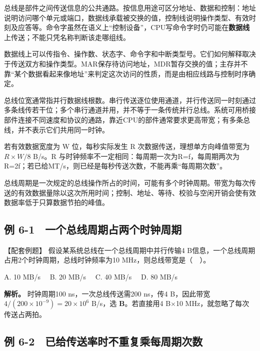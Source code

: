 总线是部件之间传送信息的公共通路。按信息用途可区分地址、数据和控制：地址说明访问哪个单元或端口，数据线承载被交换的值，控制线说明操作类型、有效时刻及应答等。命令字虽然在语义上``控制设备''，CPU写命令字时仍可能在\textbf{数据线}上传送；不能只凭名称判断该走哪组线。

数据线上可以传指令、操作数、状态字、命令字和中断类型号。它们如何解释取决于传送双方和操作类型。MAR保存待访问地址，MDR暂存交换的值；主存并不靠``某个数据看起来像地址''来判定这次访问的性质，而是由相应线路与控制时序确定。

总线位宽通常指并行数据线根数。串行传送逐位使用通道，并行传送同一时刻通过多条线传若干位；多个串行通道并用，并不等于一条传统并行总线。系统可用桥接部件连接不同速度和协议的通路，靠近CPU的部件通常要求更高带宽；有多条总线，并不表示它们共用同一时钟。

{\begin{methodbox}[带宽先写每次字节数与每秒次数]

若有效数据宽度为 W 位，每秒实际发生 R 次数据传送，理想单方向峰值带宽为 \(R\times W/8\) B/s。R 与时钟频率不一定相同：每周期一次为R=f，每周期两次为R=2f；若已给MT/s，则已经是每秒传送次数，不能再乘``每周期次数''。

总线周期是一次规定的总线操作所占的时间，可能有多个时钟周期。带宽为每次传送的有效数据量除以这次所用时间；控制、地址、等待、校验与空闲开销会使有效数据率低于只算数据节拍的峰值。

\end{methodbox}}

\subsection{例 6-1　一个总线周期占两个时钟周期}\label{CO06-example-1}

【配套例题】 假设某系统总线在一个总线周期中并行传输4 B信息，一个总线周期占用2个时钟周期，总线时钟频率为10 MHz，则总线带宽是（　）。

A. 10 MB/s　 B. 20 MB/s　 C. 40 MB/s　 D. 80 MB/s

\textbf{解析。} 时钟周期100 ns，一次总线传送需200 ns，传4 B，因此带宽 \(4/(200\times10^{-9})=20\times10^6\) B/s，选 \textbf{B}。若直接用4 B\ensuremath{\times}10 MHz，就忽略了每次传送占两拍。

\subsection{例 6-2　已给传送率时不重复乘每周期次数}\label{CO06-example-2}

